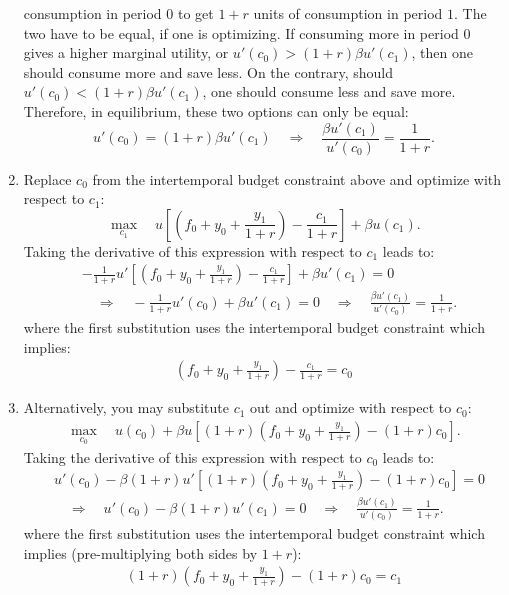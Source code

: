 \documentclass[]{book}
\begin{document}
\begin{enumerate}
  consumption in period \(0\) to get \(1+r\) units of consumption in
  period \(1\). The two have to be equal, if one is optimizing. If
  consuming more in period \(0\) gives a higher marginal utility, or
  \(u'(c_{0})>(1+r)\beta u'(c_{1})\), then one should consume more and
  save less. On the contrary, should \(u'(c_{0})<(1+r)\beta u'(c_{1})\),
  one should consume less and save more. Therefore, in equilibrium,
  these two options can only be equal:
  \[u'(c_{0})=(1+r)\beta u'(c_{1})\quad\Rightarrow\quad \boxed{\frac{\beta u'(c_{1})}{u'(c_{0})}=\frac{1}{1+r}}.\]
\item
  Replace \(c_{0}\) from the intertemporal budget constraint above and
  optimize with respect to \(c_{1}\):
  \[\max_{c_{1}}\quad u\left[\left(f_{0}+y_{0}+\frac{y_{1}}{1+r}\right)-\frac{c_{1}}{1+r}\right]+\beta u(c_{1}).\]
  Taking the derivative of this expression with respect to \(c_1\) leads
  to: \[
  \begin{aligned}
  &-\frac{1}{1+r} u'\left[\left(f_{0}+y_{0}+\frac{y_{1}}{1+r}\right)-\frac{c_{1}}{1+r}\right]+\beta u'(c_{1})=0\\
  &\quad\Rightarrow\quad-\frac{1}{1+r}u'(c_{0})+\beta u'(c_{1})=0\quad\Rightarrow\quad \boxed{\frac{\beta u'(c_{1})}{u'(c_{0})}=\frac{1}{1+r}}.
  \end{aligned}
  \] where the first substitution uses the intertemporal budget
  constraint which implies: \[
  \begin{aligned}
  \left(f_{0}+y_{0}+\frac{y_{1}}{1+r}\right)-\frac{c_{1}}{1+r}=c_0
  \end{aligned}
  \]
\item
  Alternatively, you may substitute \(c_{1}\) out and optimize with
  respect to \(c_{0}\): \[
  \begin{aligned}
  \max_{c_{0}}\quad u(c_{0})+\beta u\left[(1+r)\left(f_{0}+y_{0}+\frac{y_{1}}{1+r}\right)-(1+r)c_{0}\right].
  \end{aligned}
  \] Taking the derivative of this expression with respect to \(c_0\)
  leads to: \[
  \begin{aligned}
  &u'(c_{0})-\beta(1+r)u'\left[(1+r)\left(f_{0}+y_{0}+\frac{y_{1}}{1+r}\right)-(1+r)c_{0}\right]=0\\
  &\quad\Rightarrow\quad u'(c_{0})-\beta(1+r)u'(c_{1})=0\quad\Rightarrow\quad \boxed{\frac{\beta u'(c_{1})}{u'(c_{0})}=\frac{1}{1+r}}.
  \end{aligned}
  \] where the first substitution uses the intertemporal budget
  constraint which implies (pre-multiplying both sides by \(1+r\)): \[
  \begin{aligned}
  (1+r)\left(f_{0}+y_{0}+\frac{y_{1}}{1+r}\right)-(1+r)c_{0}=c_1
  \end{aligned}
  \]
\end{enumerate}
\end{document}
